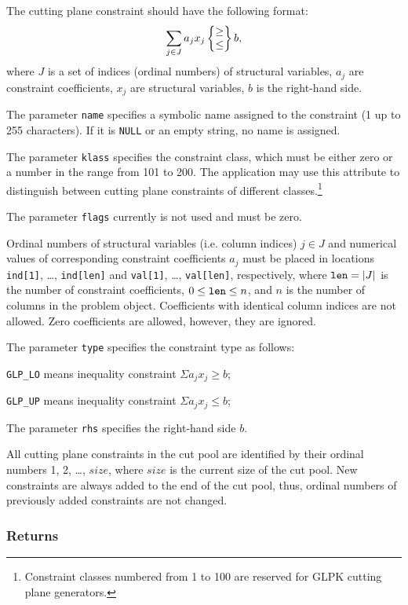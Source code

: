 The cutting plane constraint should have the following format:
$$\sum_{j\in J}a_jx_j\left\{\begin{array}{@{}c@{}}\geq\\\leq\\
\end{array}\right\}b,$$
where $J$ is a set of indices (ordinal numbers) of structural variables,
$a_j$ are constraint coefficients, $x_j$ are structural variables, $b$
is the right-hand side.

The parameter \verb|name| specifies a symbolic name assigned to the
constraint (1 up to 255 characters). If it is \verb|NULL| or an empty
string, no name is assigned.

The parameter \verb|klass| specifies the constraint class, which must
be either zero or a number in the range from 101 to 200. The application
may use this attribute to distinguish between cutting plane constraints
of different classes.\footnote{Constraint classes numbered from 1 to 100
are reserved for GLPK cutting plane generators.}

The parameter \verb|flags| currently is not used and must be zero.

Ordinal numbers of structural variables (i.e. column indices) $j\in J$
and numerical values of corresponding constraint coefficients $a_j$ must
be placed in locations \verb|ind[1]|, \dots, \verb|ind[len]| and
\verb|val[1]|, \dots, \verb|val[len]|, respectively, where
${\tt len}=|J|$ is the number of constraint coefficients,
$0\leq{\tt len}\leq n$, and $n$ is the number of columns in the problem
object. Coefficients with identical column indices are not allowed.
Zero coefficients are allowed, however, they are ignored.

The parameter \verb|type| specifies the constraint type as follows:

\verb|GLP_LO| means inequality constraint $\Sigma a_jx_j\geq b$;

\verb|GLP_UP| means inequality constraint $\Sigma a_jx_j\leq b$;

The parameter \verb|rhs| specifies the right-hand side $b$.

All cutting plane constraints in the cut pool are identified by their
ordinal numbers 1, 2, \dots, $size$, where $size$ is the current size
of the cut pool. New constraints are always added to the end of the cut
pool, thus, ordinal numbers of previously added constraints are not
changed.

\subsubsection*{Returns}

